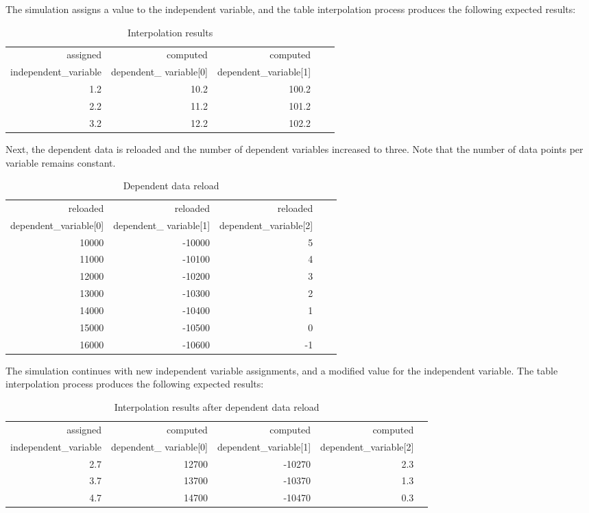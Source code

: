 \documentclass[11pt,fleqn]{report}
\begin{document}
The simulation assigns a value to the independent variable,
and the table interpolation process produces the following expected results:
\begin{table}[H]
\caption{Interpolation results}
\begin{center}
\begin{tabular}{|r|r|r|r|r|} \hline
assigned & computed & computed \\
independent\_variable & dependent\_ variable[0] & dependent\_variable[1] \\
\hline\hline
1.2 & 10.2 & 100.2 \\ \hline
2.2 & 11.2 & 101.2 \\ \hline
3.2 & 12.2 & 102.2 \\ \hline
\end{tabular}
\end{center}
\end{table}

Next, the dependent data is reloaded  and the number of dependent variables
increased to three.  Note that the number of data points per variable
remains constant.

\begin{table}[H]
\caption{Dependent data reload}
\begin{center}
\begin{tabular}{|r|r|r|r|r|} \hline
reloaded & reloaded & reloaded \\
dependent\_variable[0] & dependent\_ variable[1] & dependent\_variable[2] \\
\hline\hline
10000 & -10000 & 5 \\ \hline
11000 & -10100 & 4 \\ \hline
12000 & -10200 & 3 \\ \hline
13000 & -10300 & 2 \\ \hline
14000 & -10400 & 1 \\ \hline
15000 & -10500 & 0 \\ \hline
16000 & -10600 & -1 \\ \hline
\end{tabular}
\end{center}
\end{table}

The simulation continues with new independent variable assignments,
and a modified value for the independent variable.
The table interpolation process produces the following expected results:
\begin{table}[H]
\caption{Interpolation results after dependent data reload}
\begin{center}
\begin{tabular}{|r|r|r|r|r|} \hline
assigned & computed & computed & computed  \\
independent\_variable & dependent\_ variable[0] & dependent\_variable[1]
 & dependent\_variable[2]\\
\hline\hline
2.7 & 12700 & -10270 & 2.3 \\ \hline
3.7 & 13700 & -10370 & 1.3 \\ \hline
4.7 & 14700 & -10470 & 0.3 \\ \hline
\end{tabular}
\end{center}
\end{table}
\end{document}
